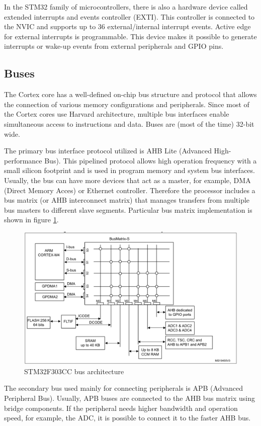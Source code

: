 In the  STM32 family of microcontrollers, there is also a hardware device called extended interrupts and events controller (EXTI). This controller is connected to the NVIC and supports up to 36 external/internal interrupt events. Active edge for external interrupts is programmable. This device makes it possible to generate interrupts or wake-up events from external peripherals and GPIO pins.

	\subsection{Buses}
	\label{sub:buses}
The Cortex core has a well-defined on-chip bus structure and protocol that allows the connection of various memory configurations and peripherals. Since most of the Cortex cores use Harvard architecture, multiple bus interfaces enable simultaneous access to instructions and data. Buses are (most of the time) 32-bit wide.

The primary bus interface protocol utilized is AHB Lite (Advanced High-performance Bus). This pipelined protocol allows high operation frequency with a small silicon footprint and is used in program memory and system bus interfaces. Usually, the bus can have more devices that act as a master, for example, DMA (Direct Memory Acces) or Ethernet controller. Therefore the processor includes a bus matrix (or AHB interconnect matrix) that manages transfers from multiple bus masters to different slave segments. Particular bus matrix implementation is shown in figure \ref{fig:f303_busmatrix}.
\begin{figure}
\centering
\includegraphics[width=0.7\linewidth]{support/pic/f303_bus_matrix.png}
\caption{STM32F303CC bus architecture \cite{f303_ref}} %
\label{fig:f303_busmatrix}
\end{figure}

The secondary bus used mainly for connecting peripherals is APB (Advanced Peripheral Bus). Usually, APB buses are connected to the AHB bus matrix using bridge components. If the peripheral needs higher bandwidth and operation speed, for example, the ADC, it is possible to connect it to the faster AHB bus.

